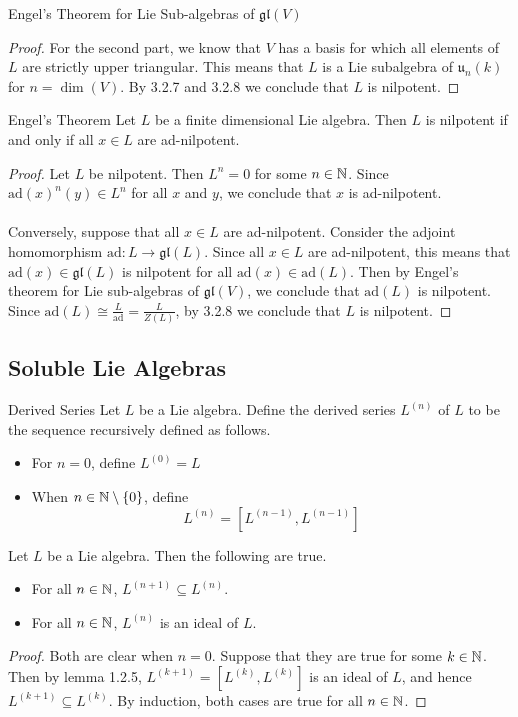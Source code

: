 \documentclass[a4paper]{article}
\begin{document}
\begin{prp}{Engel's Theorem for Lie Sub-algebras of $\mathfrak{gl}(V)$}{}
\begin{proof}
For the second part, we know that $V$ has a basis for which all elements of $L$ are strictly upper triangular. This means that $L$ is a Lie subalgebra of $\mathfrak{u}_n(k)$ for $n=\dim(V)$. By 3.2.7 and 3.2.8 we conclude that $L$ is nilpotent. 
\end{proof}
\end{prp}

\begin{thm}{Engel's Theorem}{} Let $L$ be a finite dimensional Lie algebra. Then $L$ is nilpotent if and only if all $x\in L$ are ad-nilpotent. \tcbline
\begin{proof}
Let $L$ be nilpotent. Then $L^n=0$ for some $n\in\mathbb{N}$. Since $\text{ad}(x)^n(y)\in L^n$ for all $x$ and $y$, we conclude that $x$ is ad-nilpotent. \\~\\

Conversely, suppose that all $x\in L$ are ad-nilpotent. Consider the adjoint homomorphism $\text{ad}:L\to\mathfrak{gl}(L)$. Since all $x\in L$ are ad-nilpotent, this means that $\text{ad}(x)\in\mathfrak{gl}(L)$ is nilpotent for all $\text{ad}(x)\in\text{ad}(L)$. Then by Engel's theorem for Lie sub-algebras of $\mathfrak{gl}(V)$, we conclude that $\text{ad}(L)$ is nilpotent. Since $\text{ad}(L)\cong\frac{L}{\text{ad}}=\frac{L}{Z(L)}$, by 3.2.8 we conclude that $L$ is nilpotent. 
\end{proof}
\end{thm}

\subsection{Soluble Lie Algebras}
\begin{defn}{Derived Series}{} Let $L$ be a Lie algebra. Define the derived series $L^{(n)}$ of $L$ to be the sequence recursively defined as follows. 
\begin{itemize}
\item For $n=0$, define $L^{(0)}=L$
\item When $n\in\mathbb{N}\setminus\{0\}$, define $$L^{(n)}=[L^{(n-1)},L^{(n-1)}]$$
\end{itemize}
\end{defn}

\begin{lmm}{}{} Let $L$ be a Lie algebra. Then the following are true. 
\begin{itemize}
\item For all $n\in\mathbb{N}$, $L^{(n+1)}\subseteq L^{(n)}$. 
\item For all $n\in\mathbb{N}$, $L^{(n)}$ is an ideal of $L$. 
\end{itemize} \tcbline
\begin{proof}
Both are clear when $n=0$. Suppose that they are true for some $k\in\mathbb{N}$. Then by lemma 1.2.5, $L^{(k+1)}=[L^{(k)},L^{(k)}]$ is an ideal of $L$, and hence $L^{(k+1)}\subseteq L^{(k)}$. By induction, both cases are true for all $n\in\mathbb{N}$. 
\end{proof}
\end{lmm}
\end{document}
